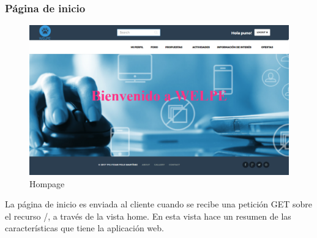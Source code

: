 \subsubsection{Página de inicio}
\label{subsubsec:home}
\begin{figure}[H]
\centering
\includegraphics[width=12cm]{img/home}
\caption{Hompage}
\label{figura:home}
\end{figure}
La página de inicio es enviada al cliente cuando se recibe una petición GET sobre el recurso /, a través de la vista home. En esta vista hace un resumen de las características que tiene la aplicación web.

